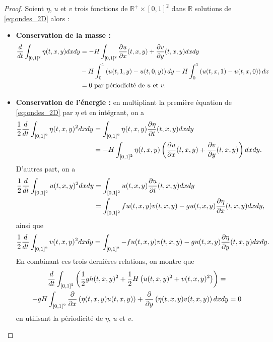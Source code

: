 \begin{proof}
Soient $\eta$, $u$ et $v$ trois fonctions de $\mathbb{R}^+ \times [0,1]^2$ dans $\mathbb{R}$ solutions de \eqref{eq:ondes_2D} alors :
\begin{itemize}
\item \textbf{Conservation de la masse :}
\begin{align*}
\dfrac{d}{dt} \displaystyle\int_{[0,1]^2} \eta(t,x,y)dxdy & = - H \displaystyle\int_{[0,1]^2} \dfrac{\partial u}{\partial x}(t,x,y) + \dfrac{\partial v}{\partial y}(t,x,y) dx dy \\
	& - H \displaystyle\int_0^1 \left( u(t,1,y) - u(t,0,y) \right)dy  - H \displaystyle\int_0^1 \left( u(t,x,1) - u(t,x,0) \right)dx \\
	& = 0 \text{ par périodicité de } u \text{ et } v. 
\end{align*}

\item \textbf{Conservation de l'énergie :} en multipliant la première équation de \eqref{eq:ondes_2D} par $\eta$ et en intégrant, on a 
\begin{align*}
\dfrac{1}{2} \dfrac{d}{dt} \displaystyle\int_{[0,1]^2} \eta(t,x,y)^2 dx dy & = \displaystyle\int_{[0,1]^2} \eta(t,x,y) \dfrac{\partial \eta}{\partial t}(t,x,y) dx dy \\
	& = - H \displaystyle\int_{[0,1]^2} \eta(t,x,y) \left( \dfrac{\partial u}{\partial x}(t,x,y) + \dfrac{\partial v}{\partial y}(t,x,y) \right) dx dy.
\end{align*}
D'autres part, on a 
\begin{align*}
\dfrac{1}{2} \dfrac{d}{dt} \displaystyle\int_{[0,1]^2} u(t,x,y)^2 dx dy & = \displaystyle\int_{[0,1]^2} u(t,x,y) \dfrac{\partial u}{\partial t}(t,x,y) dx dy \\
& = \displaystyle\int_{[0,1]^2} f u(t,x,y) v(t,x,y) - g u(t,x,y) \dfrac{\partial \eta}{\partial x}(t,x,y) dx dy,
\end{align*}
ainsi que 
\begin{equation*}
\dfrac{1}{2} \dfrac{d}{dt} \displaystyle\int_{[0,1]^2} v(t,x,y)^2 dx dy =  \displaystyle\int_{[0,1]^2}  - f u(t,x,y) v(t,x,y) - g u(t,x,y) \dfrac{\partial \eta}{\partial y}(t,x,y) dx dy.
\end{equation*}
En combinant ces trois dernières relations, on montre que
\begin{multline*}
\dfrac{d}{dt} \displaystyle\int_{[0,1]^2} \left( \dfrac{1}{2} g h(t,x,y)^2 + \dfrac{1}{2} H \left( u(t,x,y)^2 + v(t,x,y)^2 \right) \right) = \\
- g H \displaystyle\int_{[0,1]^2} \dfrac{\partial}{\partial x} \left( \eta(t,x,y) u (t,x,y) \right) +  \dfrac{\partial}{\partial y} \left( \eta(t,x,y) v (t,x,y) \right) dx dy
= 0
\end{multline*}
en utilisant la périodicité de $\eta$, $u$ et $v$.
\end{itemize}
\end{proof}






